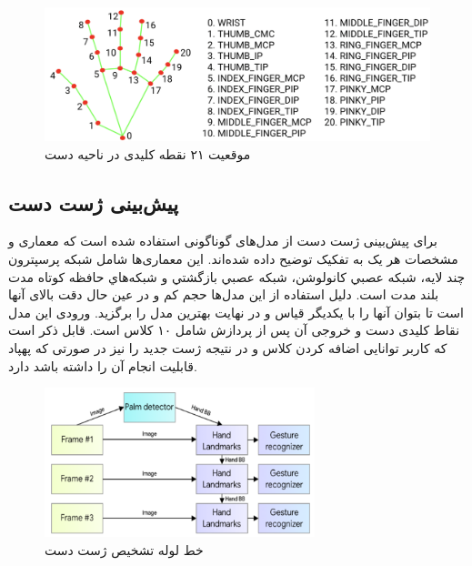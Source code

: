 \begin{figure}[h]
    \centering
    \includegraphics[width=1\textwidth]{hand-landmarks.png}
    \caption{موقعیت ۲۱ نقطه کلیدی در ناحیه دست}
\end{figure}


\subsection{پیش‌بینی ژست دست}
برای پیش‌بینی ژست دست از مدل‌های گوناگونی استفاده شده است که معماری و مشخصات هر یک به تفکیک توضیح داده‌ شده‌اند. این معماری‌ها شامل شبكه پرسپترون چند لايه، شبكه عصبي كانولوشن، شبكه عصبي بازگشتي و شبكه‌هاي حافظه كوتاه مدت بلند مدت است. دلیل استفاده از این مدل‌ها حجم کم و در عین حال دقت بالای آنها است تا بتوان آنها را با یکدیگر قیاس و در نهایت بهترین مدل را برگزید. 
ورودی این مدل نقاط کلیدی دست و خروجی آن پس از پردازش شامل ۱۰ کلاس است. قابل ذکر است که کاربر توانایی اضافه کردن کلاس و در نتیجه ژست جدید را نیز در صورتی که پهپاد قابلیت انجام آن را داشته باشد دارد.

\begin{figure}[h]
    \centering
    \includegraphics[width=0.7\textwidth]{mediapipe.png}
    \caption{خط لوله تشخیص ژست دست}
\end{figure}

